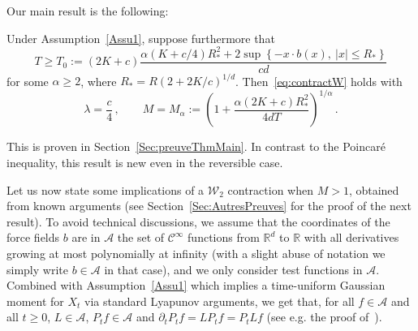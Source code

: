 \documentclass[AHL,Unicode,longabstracts,published]{cedram}
\newcommand{\R}{\mathbb R}
\newcommand{\A}{\mathcal A}
\newcommand{\clC}{\mathcal C}
\newcommand{\clW}{\mathcal W}
\newcommand{\1}{\mathbbm{1}}
\newcommand{\R}{\mathbb R}
\newcommand{\clW}{\mathcal W}
\begin{document}
Our main result is the following:
\begin{thm}\label{Thm:main}
Under Assumption~\ref{Assu1}, suppose furthermore that
\begin{equation}\label{eq:conditionT}
T\geqslant T_0:=(2K+c)\frac{ \alpha (K+c/4)R_*^2 +2 \sup\left\{-x\cdot b(x),\ |x|\leqslant R_*\right\}}{cd}
\end{equation}
for some $\alpha \geqslant 2$, where $R_*=R( 2+2K/c)^{1/d}$. Then~\eqref{eq:contractW} holds with
\[
\lambda = \frac c4 \,, \qquad M= M_\alpha := \left( 1+ \frac{\alpha (2K+c)R_*^2}{4dT}\right)^{1/\alpha}\,.
\]
\end{thm}

This is proven in Section~\ref{Sec:preuveThmMain}. In contrast to the Poincaré inequality, this result is new even in the reversible case.


Let us now state some implications of a $\clW_2$ contraction when $M>1$, obtained from known arguments (see Section~\ref{Sec:AutresPreuves} for the proof of the next result). To avoid technical discussions, we assume that the coordinates of the force fields $b$ are in $\A$ the set of $\clC^\infty$ functions from $\R^d$ to $\R$ with all derivatives growing at most polynomially at infinity (with a slight abuse of notation we simply write $b\in\A$ in that case), and we only consider test functions in $\A$. Combined with Assumption~\ref{Assu1} which implies a time-uniform Gaussian moment for $X_t$ via standard Lyapunov arguments, we get that, for all $f\in\A$ and all $t\geqslant 0$, $L\in\A$, $P_t f\in \A$ and $\partial_t P_t f = LP_t f = P_t Lf$ (see e.g. the proof of~\cite[Theorem~2.5]{EthierKurtz}).
\end{document}
